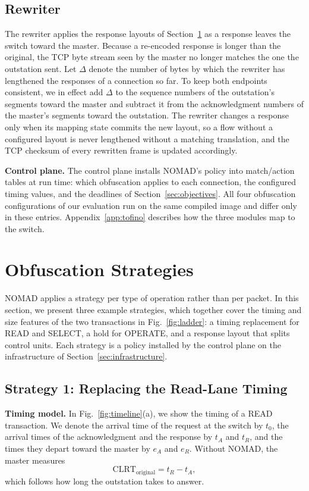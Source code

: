 \documentclass[conference]{IEEEtran}
\begin{document}
\subsection{Rewriter}

The rewriter applies the response layouts of Section~\ref{sec:strategies} as a response leaves the switch toward the master. Because a re-encoded response is longer than the original, the TCP byte stream seen by the master no longer matches the one the outstation sent. Let $\Delta$ denote the number of bytes by which the rewriter has lengthened the responses of a connection so far. To keep both endpoints consistent, we in effect add $\Delta$ to the sequence numbers of the outstation's segments toward the master and subtract it from the acknowledgment numbers of the master's segments toward the outstation. The rewriter changes a response only when its mapping state commits the new layout, so a flow without a configured layout is never lengthened without a matching translation, and the TCP checksum of every rewritten frame is updated accordingly.

\textbf{Control plane.} The control plane installs NOMAD's policy into match/action tables at run time: which obfuscation applies to each connection, the configured timing values, and the deadlines of Section~\ref{sec:objectives}. All four obfuscation configurations of our evaluation run on the same compiled image and differ only in these entries. Appendix~\ref{app:tofino} describes how the three modules map to the switch.
\section{Obfuscation Strategies}
\label{sec:strategies}

NOMAD applies a strategy per type of operation rather than per packet. In this section, we present three example strategies, which together cover the timing and size features of the two transactions in Fig.~\ref{fig:ladder}: a timing replacement for READ and SELECT, a hold for OPERATE, and a response layout that splits control units. Each strategy is a policy installed by the control plane on the infrastructure of Section~\ref{sec:infrastructure}.

\subsection{Strategy 1: Replacing the Read-Lane Timing}

\textbf{Timing model.} In Fig.~\ref{fig:timeline}(a), we show the timing of a READ transaction. We denote the arrival time of the request at the switch by $t_0$, the arrival times of the acknowledgment and the response by $t_A$ and $t_R$, and the times they depart toward the master by $e_A$ and $e_R$. Without NOMAD, the master measures
\begin{equation}
\label{eq:clrt-original}
\mathrm{CLRT}_{\mathrm{original}} = t_R - t_A ,
\end{equation}
which follows how long the outstation takes to answer.
\end{document}

